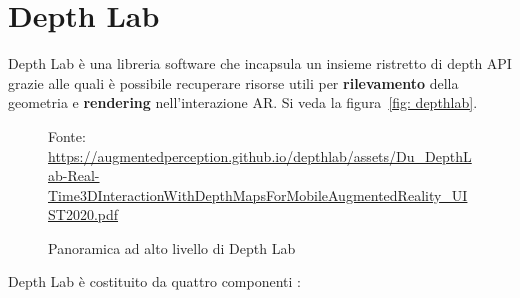 \documentclass[crop=false, class=book]{standalone}
\begin{document}
		
		\section{Depth Lab}
		
		Depth Lab è una libreria software che incapsula un insieme ristretto di depth API grazie alle quali è possibile recuperare risorse utili per \textbf{rilevamento} della geometria e \textbf{rendering} nell'interazione AR. Si veda la figura~\vref{fig: depthlab}.
		
		\begin{figure}
				\centering
		{Fonte: \url{https://augmentedperception.github.io/depthlab/assets/Du_DepthLab-Real-Time3DInteractionWithDepthMapsForMobileAugmentedReality_UIST2020.pdf}}
				\caption{Panoramica ad alto livello di Depth Lab}
				\label{fig: depthlab}
		\end{figure}
		
		\noindent
		Depth Lab è costituito da quattro componenti \cite{ruofeidu2020depthlab}:
	
\end{document}
